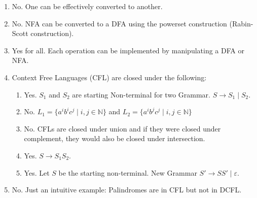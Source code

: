 \begin{solution}
  \begin{enumerate}
    \item No. One can be effectively converted to another.
    \item No. NFA can be converted to a DFA using the powerset construction (Rabin-Scott construction).
    \item Yes for all. Each operation can be implemented by manipulating a DFA or NFA.
    \item Context Free Languages (CFL) are closed under the following:
      \begin{enumerate}
	    \item Yes. $S_1$ and $S_2$ are starting Non-terminal for two Grammar. $S \to S_1 \mid S_2.$
	    \item No. $L_1 = \{a^ib^ic^j \mid i,j\in\mathbb{N}\}$ and $L_2 = \{a^ib^jc^j \mid i,j\in \mathbb{N}\}$
	    \item No. CFLs are closed under union and if they were closed under complement, they would also be closed under intersection.
	    \item Yes.  $S \to S_1  S_2.$
	    \item Yes. Let $S$ be the starting non-terminal. New Grammar $S' \to S S' \mid \varepsilon$.
	\end{enumerate}
    \item No. Just an intuitive example: Palindromes are in CFL but not in DCFL.
  \end{enumerate}
\end{solution}

